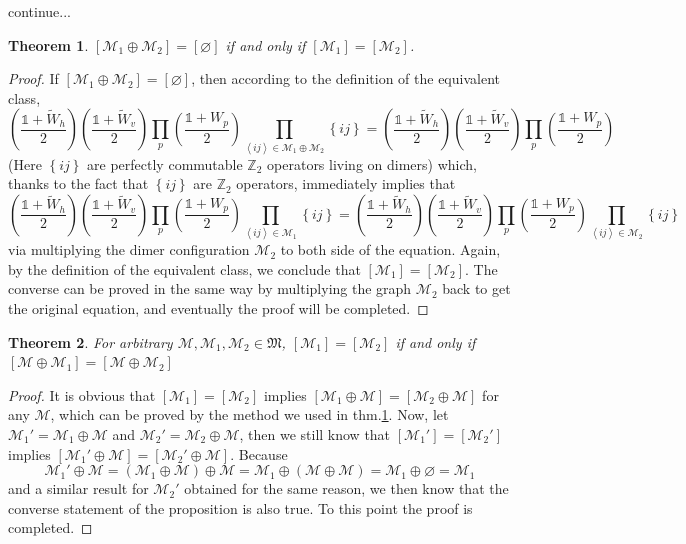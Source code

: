 \documentclass[12font]{article}
\newtheorem{theorem}{Theorem}[section]
\theoremstyle{definition}
\numberwithin{equation}{section}
\newcommand{\anglelr}[1]{\left\langle #1 \right\rangle}
\newcommand{\lr}[1]{\left(  #1  \right)}
\newcommand{\lrg}[1]{\left\{  #1  \right\}}
\newcommand{\alert}[1]{{\color{red}#1}}
\begin{document}
\alert{continue...}


\begin{theorem}\label{equ.thm}
  $[\mathcal{M}_1\oplus\mathcal{M}_2] = [\mathcal{\varnothing}]$ if and only if $[\mathcal{M}_1] = [\mathcal{M}_2]$.
\end{theorem}
\begin{proof}
  If $[\mathcal{M}_1\oplus\mathcal{M}_2] = [\mathcal{\varnothing}]$, then according to the definition of the equivalent class,
  \[
  \lr{\frac{\mathds{1}+\tilde{W}_h}{2}} \lr{\frac{\mathds{1}+\tilde{W}_v}{2}}\prod_{p} \lr{\frac{\mathds{1}+W_p}{2}} \prod_{\anglelr{ij}\in\mathcal{M}_1\oplus\mathcal{M}_2}\lrg{ij} = \lr{\frac{\mathds{1}+\tilde{W}_h}{2}} \lr{\frac{\mathds{1}+\tilde{W}_v}{2}}\prod_{p} \lr{\frac{\mathds{1}+W_p}{2}}
  \]
  \alert{(Here $\lrg{ij}$ are perfectly commutable $\mathbb{Z}_2$ operators living on dimers)} which, thanks to the fact that $\lrg{ij}$ are $\mathbb{Z}_2$ operators, immediately implies that
  \[
  \lr{\frac{\mathds{1}+\tilde{W}_h}{2}} \lr{\frac{\mathds{1}+\tilde{W}_v}{2}}\prod_{p} \lr{\frac{\mathds{1}+W_p}{2}} \prod_{\anglelr{ij}\in\mathcal{M}_1}\lrg{ij} = \lr{\frac{\mathds{1}+\tilde{W}_h}{2}} \lr{\frac{\mathds{1}+\tilde{W}_v}{2}}\prod_{p} \lr{\frac{\mathds{1}+W_p}{2}}
  \prod_{\anglelr{ij}\in\mathcal{M}_2}\lrg{ij}
  \]
  via multiplying the dimer configuration $\mathcal{M}_2$ to both side of the equation. Again, by the definition of the equivalent class, we conclude that $[\mathcal{M}_1] = [\mathcal{M}_2]$. The converse can be proved in the same way by multiplying the graph $\mathcal{M}_2$ back to get the original equation, and eventually the proof will be completed.
\end{proof}
\begin{theorem}\label{cancel.thm}
  For arbitrary $\mathcal{M},\mathcal{M}_1,\mathcal{M}_2\in\mathfrak{M}$, $[\mathcal{M}_1] = [\mathcal{M}_2]$ if and only if $[\mathcal{M}\oplus\mathcal{M}_1] = [\mathcal{M}\oplus\mathcal{M}_2]$
\end{theorem}
\begin{proof}
   It is obvious that $[\mathcal{M}_1] = [\mathcal{M}_2]$ implies $[\mathcal{M}_1\oplus\mathcal{M}] = [\mathcal{M}_2\oplus\mathcal{M}]$ for any $\mathcal{M}$, which can be proved by the method we used in thm.\ref{equ.thm}. Now, let $\mathcal{M}_1'=\mathcal{M}_1\oplus\mathcal{M}$ and $\mathcal{M}_2'=\mathcal{M}_2\oplus\mathcal{M}$, then we still know that $[\mathcal{M}_1']=[\mathcal{M}_2']$ implies $[\mathcal{M}_1'\oplus\mathcal{M}]=[\mathcal{M}_2'\oplus\mathcal{M}]$. Because 
  \[\mathcal{M}_1'\oplus\mathcal{M} = (\mathcal{M}_1\oplus\mathcal{M})\oplus\mathcal{M} = \mathcal{M}_1\oplus (\mathcal{M}\oplus\mathcal{M}) = \mathcal{M}_1\oplus \varnothing = \mathcal{M}_1\]
  and a similar result for $\mathcal{M}_2'$ obtained for the same reason, we then know that the converse statement of the proposition is also true. To this point the proof is completed.
\end{proof}
\end{document}
